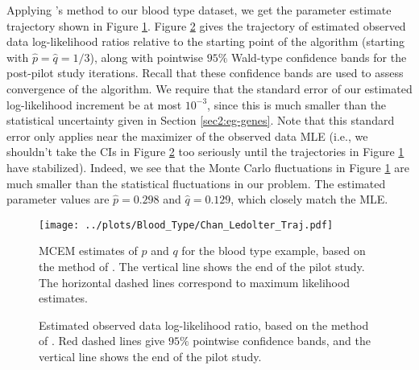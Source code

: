\documentclass[11pt, oneside]{article}   	%
\begin{document}
Applying \citeauthor{Cha95}'s method to our blood type dataset, we get the parameter estimate trajectory shown in Figure \ref{fig2:blood_CL_MCEM_estimates}. Figure \ref{fig2:blood_CL_MCEM_likelihoods} gives the trajectory of estimated observed data log-likelihood ratios relative to the starting point of the algorithm (starting with $\hat{p} = \hat{q} = 1/3$), along with pointwise $95\%$ Wald-type confidence bands for the post-pilot study iterations. Recall that these confidence bands are used to assess convergence of the algorithm. We require that the standard error of our estimated log-likelihood increment be at most $10^{-3}$, since this is much smaller than the statistical uncertainty given in Section \ref{sec2:eg-genes}. Note that this standard error only applies near the maximizer of the observed data MLE (i.e., we shouldn't take the CIs in Figure \ref{fig2:blood_CL_MCEM_likelihoods} too seriously until the trajectories in Figure \ref{fig2:blood_CL_MCEM_estimates} have stabilized). Indeed, we see that the Monte Carlo fluctuations in Figure \ref{fig2:blood_CL_MCEM_estimates} are much smaller than the statistical fluctuations in our problem. The estimated parameter values are $\hat{p} = 0.298$ and $\hat{q} = 0.129$, which closely match the MLE.

\begin{figure}
    \centering
    \caption{MCEM estimates of $p$ and $q$ for the blood type example, based on the method of \citet{Cha95}. The vertical line shows the end of the pilot study. The horizontal dashed lines correspond to maximum likelihood estimates.}
    \texttt{[image: ../plots/Blood\_Type/Chan\_Ledolter\_Traj.pdf]} 
    \label{fig2:blood_CL_MCEM_estimates}
\end{figure}

\begin{figure}
    \centering
    \caption{Estimated observed data log-likelihood ratio, based on the method of \citet{Cha95}. Red dashed lines give $95\%$ pointwise confidence bands, and the vertical line shows the end of the pilot study.}

    
    \label{fig2:blood_CL_MCEM_likelihoods}
\end{figure}
\end{document}
